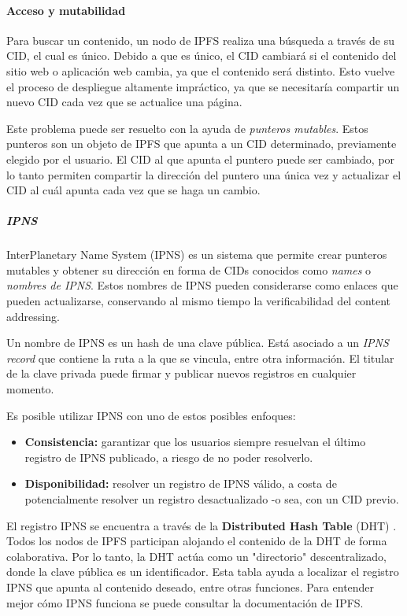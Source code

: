 \paragraph{Acceso y mutabilidad}

Para buscar un contenido, un nodo de IPFS realiza una búsqueda a través de su CID, el cual es único. Debido a que es único, el CID cambiará si el contenido del sitio web o aplicación web cambia, ya que el contenido será distinto. Esto vuelve el proceso de despliegue altamente impráctico, ya que se necesitaría compartir un nuevo CID cada vez que se actualice una página.

Este problema puede ser resuelto con la ayuda de \textit{punteros mutables}. Estos punteros son un objeto de IPFS que apunta a un CID determinado, previamente elegido por el usuario. El CID al que apunta el puntero puede ser cambiado, por lo tanto permiten compartir la dirección del puntero una única vez y actualizar el CID al cuál apunta cada vez que se haga un cambio.

\subparagraph{IPNS}

InterPlanetary Name System (IPNS) \cite{ipns} es un sistema que permite crear  punteros mutables y obtener su dirección en forma de CIDs conocidos como \textit{names} o \textit{nombres de IPNS}. Estos nombres de IPNS pueden considerarse como enlaces que pueden actualizarse, conservando al mismo tiempo la verificabilidad del content addressing.

Un nombre de IPNS es un hash de una \cite{ipns-hash} clave pública. Está asociado a un \textit{IPNS record} \cite{ipns-record} que contiene la ruta a la que se vincula, entre otra información. El titular de la clave privada puede firmar y publicar nuevos registros en cualquier momento.

Es posible utilizar IPNS con uno de estos posibles enfoques:
\begin{itemize}
    \item \textbf{Consistencia:} garantizar que los usuarios siempre resuelvan el último registro de IPNS publicado, a riesgo de no poder resolverlo.
    \item \textbf{Disponibilidad:} resolver un registro de IPNS válido, a costa de potencialmente resolver un registro desactualizado -o sea, con un CID previo.
\end{itemize}

El registro IPNS se encuentra a través de la \textbf{Distributed Hash Table} (DHT) \cite{dht}. Todos los nodos de IPFS participan alojando el contenido de la DHT de forma colaborativa. Por lo tanto, la DHT actúa como un "directorio" descentralizado, donde la clave pública es un identificador. Esta tabla ayuda a localizar el registro IPNS que apunta al contenido deseado, entre otras funciones. Para entender mejor cómo IPNS funciona se puede consultar la documentación de IPFS.

